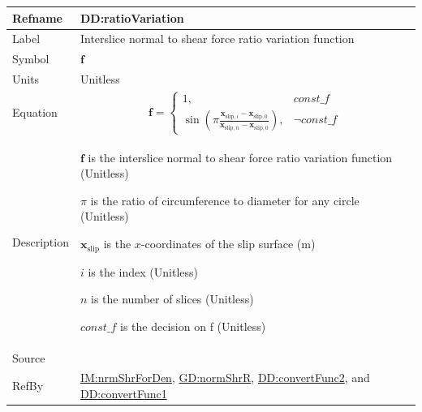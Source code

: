 \documentclass[12pt]{article}
\begin{document}
\medskip
\noindent
\begin{minipage}{\textwidth}
\begin{tabular}{>{\raggedright}p{}>{\raggedright\arraybackslash}p{}}
\toprule \textbf{Refname} & \textbf{DD:ratioVariation}
\label{DD:ratioVariation}
\\ \midrule
Label & Interslice normal to shear force ratio variation function
        
\\ \midrule
Symbol & $\symbf{f}$
         
\\ \midrule
Units & Unitless
        
\\ \midrule
Equation & \begin{displaymath}
           \symbf{f}=\begin{cases}
                     1, & \mathit{const\_f}\\
                     \sin\left(π \frac{{\symbf{x}_{\text{slip},i}}-{\symbf{x}_{\text{slip},0}}}{{\symbf{x}_{\text{slip},n}}-{\symbf{x}_{\text{slip},0}}}\right), & \neg{}\mathit{const\_f}
                     \end{cases}
           \end{displaymath}
\\ \midrule
Description & \begin{symbDescription}
              \item{$\symbf{f}$ is the interslice normal to shear force ratio variation function (Unitless)}
              \item{$π$ is the ratio of circumference to diameter for any circle (Unitless)}
              \item{${\symbf{x}_{\text{slip}}}$ is the $x$-coordinates of the slip surface (${\text{m}}$)}
              \item{$i$ is the index (Unitless)}
              \item{$n$ is the number of slices (Unitless)}
              \item{$\mathit{const\_f}$ is the decision on f (Unitless)}
              \end{symbDescription}
\\ \midrule
Source & \cite{fredlund1977}
         
\\ \midrule
RefBy & \hyperref[IM:nrmShrForDen]{IM:nrmShrForDen}, \hyperref[GD:normShrR]{GD:normShrR}, \hyperref[DD:convertFunc2]{DD:convertFunc2}, and \hyperref[DD:convertFunc1]{DD:convertFunc1}
        
\\ \bottomrule
\end{tabular}
\end{minipage}
\end{document}
